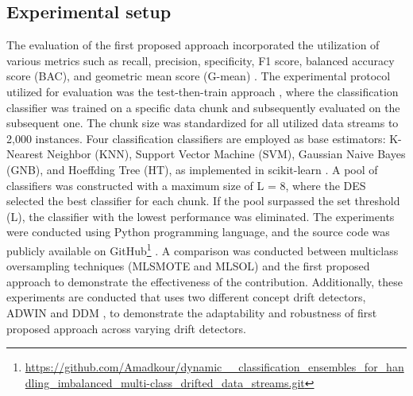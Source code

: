 \subsection{Experimental setup}
The evaluation of the first proposed approach incorporated the utilization of various metrics such as recall, precision, specificity, F1 score, balanced accuracy score (BAC), and geometric mean score (G-mean) \cite{bu2016pdf}. The experimental protocol utilized for evaluation was the test-then-train approach \cite{venkatasubramanianinformation}, where the classification classifier was trained on a specific data chunk and subsequently evaluated on the subsequent one. The chunk size was standardized for all utilized data streams to 2,000 instances. Four classification classifiers are employed as base estimators: K-Nearest Neighbor (KNN), Support Vector Machine (SVM), Gaussian Naive Bayes (GNB), and Hoeffding Tree (HT), as implemented in scikit-learn \cite{frias2014online}. A pool of classifiers was constructed with a maximum size of L = 8, where the DES selected the best classifier for each chunk. If the pool surpassed the set threshold (L), the classifier with the lowest performance was eliminated. The experiments were conducted using Python programming language, and the source code was publicly available on GitHub\footnote{\url{https://github.com/Amadkour/dynamic__classification_ensembles_for_handling_imbalanced_multi-class_drifted_data_streams.git}} . A comparison was conducted between multiclass oversampling techniques (MLSMOTE and MLSOL) and the first proposed approach to demonstrate the effectiveness of the contribution. Additionally, these experiments are conducted that uses two different concept drift detectors, ADWIN \cite{storkey2008training} and DDM \cite{losing2016knn}, to demonstrate the adaptability and robustness of first proposed approach across varying drift detectors.


